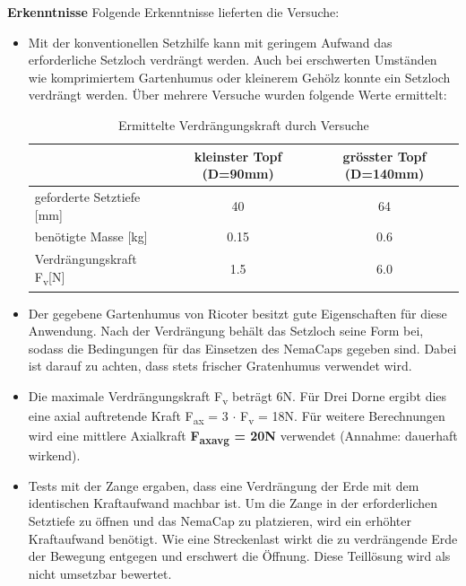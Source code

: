 \textbf{Erkenntnisse}
\newline
Folgende Erkenntnisse lieferten die Versuche:
\begin{itemize}
	\item Mit der konventionellen Setzhilfe kann mit geringem Aufwand das erforderliche Setzloch verdrängt werden. Auch bei erschwerten Umständen wie komprimiertem Gartenhumus oder kleinerem Gehölz konnte ein Setzloch verdrängt werden. Über mehrere Versuche wurden folgende Werte ermittelt:
\begin{table}[H]
	\begin{tabular}{|l|c|c|}
		\hline 
		& kleinster Topf (D=90mm) & grösster Topf (D=140mm) \\ 
		\hline 
		geforderte Setztiefe [mm] & 40 & 64 \\ 
		\hline 
		benötigte Masse [kg] & 0.15 & 0.6 \\ 
		\hline 
		Verdrängungskraft F\textsubscript{v}[N] & 1.5  & 6.0  \\ 
		\hline 
	\end{tabular} 
	\caption{Ermittelte Verdrängungskraft durch Versuche}
	\label{tab:verdraengungskraft}
\end{table}	
	
	\item Der gegebene Gartenhumus von Ricoter besitzt gute Eigenschaften für diese Anwendung. Nach der Verdrängung behält das Setzloch seine Form bei, sodass die Bedingungen für das Einsetzen des NemaCaps gegeben sind. Dabei ist darauf zu achten, dass stets frischer Gratenhumus verwendet wird.
	
	\item Die maximale Verdrängungskraft F\textsubscript{v} beträgt 6N. Für Drei Dorne ergibt dies eine axial auftretende Kraft F\textsubscript{ax} = 3 $\cdot$ F\textsubscript{v} = 18N. Für weitere Berechnungen wird eine mittlere Axialkraft \textbf{F\textsubscript{axavg} = 20N} verwendet (Annahme: dauerhaft wirkend).
	
	\item Tests mit der Zange ergaben, dass eine Verdrängung der Erde mit dem identischen Kraftaufwand machbar ist. Um die Zange in der erforderlichen Setztiefe zu öffnen und das NemaCap zu platzieren, wird ein erhöhter Kraftaufwand benötigt. Wie eine Streckenlast wirkt die zu verdrängende Erde der Bewegung entgegen und erschwert die Öffnung. Diese Teillösung wird als nicht umsetzbar bewertet.
\end{itemize} 

